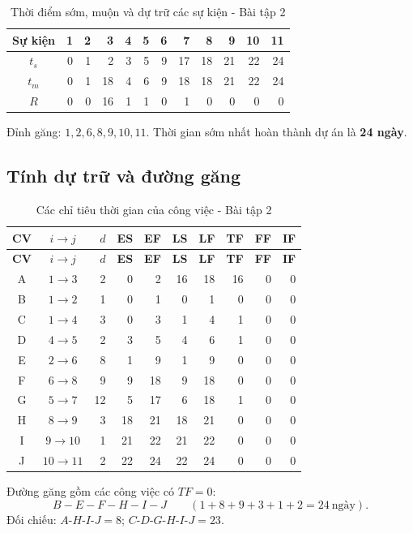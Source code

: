 \begin{table}[H]\centering
\caption{Thời điểm sớm, muộn và dự trữ các sự kiện - Bài tập 2}
\begin{tabular}{c|rrrrrrrrrrr}
\toprule
Sự kiện & 1&2&3&4&5&6&7&8&9&10&11\\
\midrule
$t_s$ & 0&1&2&3&5&9&17&18&21&22&24\\
$t_m$ & 0&1&18&4&6&9&18&18&21&22&24\\
$R$   & 0&0&16&1&1&0&1&0&0&0&0\\
\bottomrule
\end{tabular}
\end{table}

Đỉnh găng: $1,2,6,8,9,10,11$. Thời gian sớm nhất hoàn thành dự án là \textbf{24 ngày}.

\subsection{Tính dự trữ và đường găng}

\begin{longtable}{c|c|r|rr|rr|rrr}
\caption{Các chỉ tiêu thời gian của công việc - Bài tập 2}\\
\toprule
\textbf{CV}&\textbf{$i\rightarrow j$}&\textbf{$d$}&\textbf{ES}&\textbf{EF}&\textbf{LS}&\textbf{LF}&\textbf{TF}&\textbf{FF}&\textbf{IF}\\
\midrule
\endfirsthead
\toprule
\textbf{CV}&\textbf{$i\rightarrow j$}&\textbf{$d$}&\textbf{ES}&\textbf{EF}&\textbf{LS}&\textbf{LF}&\textbf{TF}&\textbf{FF}&\textbf{IF}\\
\midrule
\endhead
A&$1\rightarrow 3$&2&0&2&16&18&16&0&0\\
B&$1\rightarrow 2$&1&0&1&0&1&0&0&0\\
C&$1\rightarrow 4$&3&0&3&1&4&1&0&0\\
D&$4\rightarrow 5$&2&3&5&4&6&1&0&0\\
E&$2\rightarrow 6$&8&1&9&1&9&0&0&0\\
F&$6\rightarrow 8$&9&9&18&9&18&0&0&0\\
G&$5\rightarrow 7$&12&5&17&6&18&1&0&0\\
H&$8\rightarrow 9$&3&18&21&18&21&0&0&0\\
I&$9\rightarrow 10$&1&21&22&21&22&0&0&0\\
J&$10\rightarrow 11$&2&22&24&22&24&0&0&0\\
\bottomrule
\end{longtable}

Đường găng gồm các công việc có $TF=0$:
\[
  \boxed{B-E-F-H-I-J\qquad (1+8+9+3+1+2=24\ \text{ngày})}.
\]
Đối chiếu: $A$-$H$-$I$-$J=8$; $C$-$D$-$G$-$H$-$I$-$J=23$.

